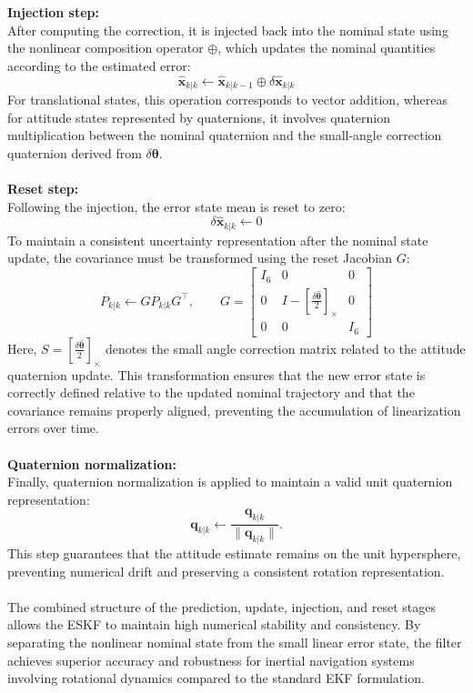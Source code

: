 \textbf{Injection step:} \\ \noindent
After computing the correction, it is injected back into the nominal state using the nonlinear composition operator $\oplus$, which updates the nominal quantities according to the estimated error:
$$
    \hat{\mathbf{x}}_{k|k} \leftarrow \hat{\mathbf{x}}_{k|k-1} \oplus \delta\hat{\mathbf{x}}_{k|k}
$$
For translational states, this operation corresponds to vector addition, whereas for attitude states represented by quaternions, it involves quaternion multiplication between the nominal quaternion and the small-angle correction quaternion derived from $\delta\boldsymbol{\theta}$.
\\ \\
\textbf{Reset step:} \\ \noindent
Following the injection, the error state mean is reset to zero:
$$
    \delta\hat{\mathbf{x}}_{k|k} \leftarrow 0
$$
To maintain a consistent uncertainty representation after the nominal state update, the covariance must be transformed using the reset Jacobian $G$:
$$
    P_{k|k} \leftarrow G P_{k|k} G^\top, \qquad 
    G =
    \begin{bmatrix}
        I_6 & 0 & 0 \\
        0 & I - [\tfrac{\delta\hat{\boldsymbol{\theta}}}{2}]_\times & 0 \\
        0 & 0 & I_6
    \end{bmatrix}
$$
Here, $S = [\tfrac{\delta\hat{\boldsymbol{\theta}}}{2}]_\times$ denotes the small angle correction matrix related to the attitude quaternion update. This transformation ensures that the new error state is correctly defined relative to the updated nominal trajectory and that the covariance remains properly aligned, preventing the accumulation of linearization errors over time.
\\ \\
\textbf{Quaternion normalization:} \\ \noindent
Finally, quaternion normalization is applied to maintain a valid unit quaternion representation:
$$
    \mathbf{q}_{k|k} \leftarrow \frac{\mathbf{q}_{k|k}}{\|\mathbf{q}_{k|k}\|}.
$$
This step guarantees that the attitude estimate remains on the unit hypersphere, preventing numerical drift and preserving a consistent rotation representation.
\\ \\
The combined structure of the prediction, update, injection, and reset stages allows the ESKF to maintain high numerical stability and consistency. By separating the nonlinear nominal state from the small linear error state, the filter achieves superior accuracy and robustness for inertial navigation systems involving rotational dynamics compared to the standard EKF formulation.



